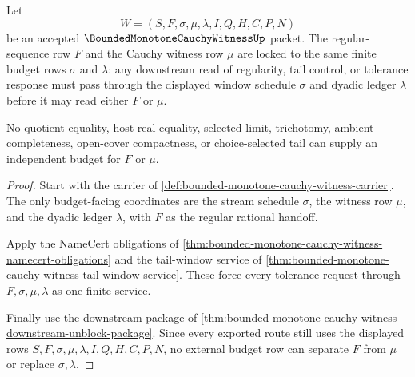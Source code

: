 \begin{theorem}
\label{thm:bounded-monotone-cauchy-witness-budget-regularity-lock}
Let
$$
W=(S,F,\sigma,\mu,\lambda,I,Q,H,C,P,N)
$$
be an accepted $\BoundedMonotoneCauchyWitnessUp$ packet. The regular-sequence row $F$ and the Cauchy witness row $\mu$ are locked to the same finite budget rows $\sigma$ and $\lambda$: any downstream read of regularity, tail control, or tolerance response must pass through the displayed window schedule $\sigma$ and dyadic ledger $\lambda$ before it may read either $F$ or $\mu$.

No quotient equality, host real equality, selected limit, trichotomy, ambient completeness, open-cover compactness, or choice-selected tail can supply an independent budget for $F$ or $\mu$.
\end{theorem}
\begin{proof}
Start with the carrier of \autoref{def:bounded-monotone-cauchy-witness-carrier}. The only budget-facing coordinates are the stream schedule $\sigma$, the witness row $\mu$, and the dyadic ledger $\lambda$, with $F$ as the regular rational handoff.

Apply the NameCert obligations of \autoref{thm:bounded-monotone-cauchy-witness-namecert-obligations} and the tail-window service of \autoref{thm:bounded-monotone-cauchy-witness-tail-window-service}. These force every tolerance request through $F,\sigma,\mu,\lambda$ as one finite service.

Finally use the downstream package of \autoref{thm:bounded-monotone-cauchy-witness-downstream-unblock-package}. Since every exported route still uses the displayed rows $S,F,\sigma,\mu,\lambda,I,Q,H,C,P,N$, no external budget row can separate $F$ from $\mu$ or replace $\sigma,\lambda$.
\end{proof}

